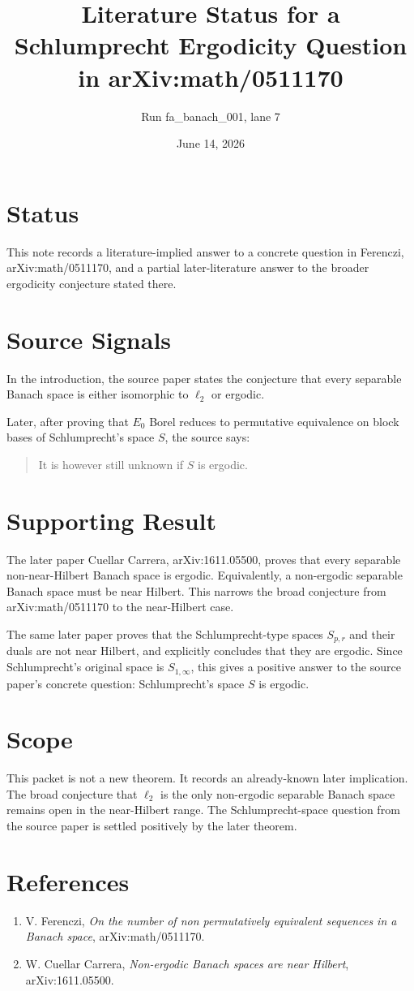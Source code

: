 \documentclass[11pt]{article}
\title{Literature Status for a Schlumprecht Ergodicity Question in arXiv:math/0511170}
\author{Run fa\_banach\_001, lane 7}
\date{June 14, 2026}
\begin{document}
\maketitle

\section*{Status}

This note records a literature-implied answer to a concrete question in
Ferenczi, arXiv:math/0511170, and a partial later-literature answer to the
broader ergodicity conjecture stated there.

\section*{Source Signals}

In the introduction, the source paper states the conjecture that every
separable Banach space is either isomorphic to $\ell_2$ or ergodic.

Later, after proving that $E_0$ Borel reduces to permutative equivalence on
block bases of Schlumprecht's space $S$, the source says:
\begin{quote}
It is however still unknown if $S$ is ergodic.
\end{quote}

\section*{Supporting Result}

The later paper Cuellar Carrera, arXiv:1611.05500, proves that every separable
non-near-Hilbert Banach space is ergodic. Equivalently, a non-ergodic separable
Banach space must be near Hilbert. This narrows the broad conjecture from
arXiv:math/0511170 to the near-Hilbert case.

The same later paper proves that the Schlumprecht-type spaces $S_{p,r}$ and
their duals are not near Hilbert, and explicitly concludes that they are
ergodic. Since Schlumprecht's original space is $S_{1,\infty}$, this gives a
positive answer to the source paper's concrete question: Schlumprecht's space
$S$ is ergodic.

\section*{Scope}

This packet is not a new theorem. It records an already-known later implication.
The broad conjecture that $\ell_2$ is the only non-ergodic separable Banach
space remains open in the near-Hilbert range. The Schlumprecht-space question
from the source paper is settled positively by the later theorem.

\section*{References}

\begin{enumerate}
\item V. Ferenczi, \emph{On the number of non permutatively equivalent
sequences in a Banach space}, arXiv:math/0511170.
\item W. Cuellar Carrera, \emph{Non-ergodic Banach spaces are near Hilbert},
arXiv:1611.05500.
\end{enumerate}
\end{document}
